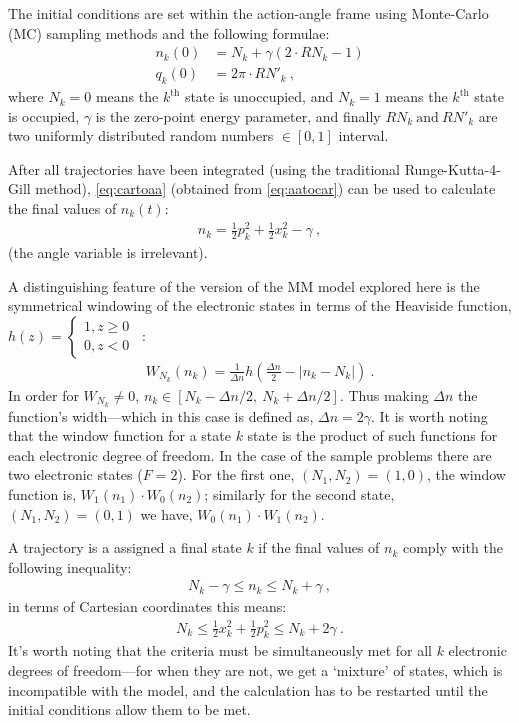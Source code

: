 The initial conditions are set within the action-angle frame using Monte-Carlo (MC) sampling methods and the following formulae:
\begin{subequations}
\begin{align}
n_{k}(0) &= N_{k} + \gamma (2 \cdot RN_{k} - 1)\\
q_{k}(0) &= 2\pi \cdot RN'_{k}~,
\end{align}
\end{subequations}
where $ N_{k} = 0$ means the $ k^{\text{th}} $ state is unoccupied, and $ N_{k} = 1 $ means the $ k^{\text{th}} $ state is occupied, $ \gamma $ is the zero-point energy parameter, and finally $ RN_{k}~\text{and}~RN'_{k} $ are two uniformly distributed random numbers $ \in [0,1] $ interval.

After all trajectories have been integrated (using the traditional Runge-Kutta-4-Gill method), \cref{eq:cartoaa} (obtained from \cref{eq:aatocar}) can be used to calculate the final values of $ n_{k}(t) $:
\begin{align}\label{eq:cartoaa}
n_{k} = \frac{1}{2} p_{k}^{2} + \frac{1}{2} x_{k}^{2} - \gamma~,
\end{align}
(the angle variable is irrelevant).

A distinguishing feature of the version of the MM model explored here is the symmetrical windowing of the electronic states in terms of the Heaviside function, $ h(z) = \left\{\begin{aligned}1, z \ge 0\\ 0, z < 0 \end{aligned}\right.$~:
\begin{align}\label{eq:window}
W_{N_{k}}(n_{k}) = \frac{1}{\Delta n} h\left(\frac{\Delta n}{2} - |n_{k}-N_{k}|\right)~.
\end{align}
In order for $ W_{N_{k}} \neq 0 $, $ n_{k} \in [N_{k} - \Delta n/2,~N_{k} + \Delta n/2]$. Thus making $ \Delta n $ the function's width---which in this case is defined as, $ \Delta n = 2\gamma $. It is worth noting that the window function for a state $ k $ state is the product of such functions for each electronic degree of freedom. In the case of the sample problems there are two electronic states ($ F = 2 $). For the first one, $( N_{1}, N_{2} ) = (1,0) $, the window function is, $ W_{1}(n_{1}) \cdot W_{0}(n_{2}) $; similarly for the second state, $ (N_{1}, N_{2}) = (0,1) $ we have, $ W_{0}(n_{1}) \cdot W_{1}(n_{2}) $.

A trajectory is a assigned a final state $ k $ if the final values of $ n_{k} $ comply with the following inequality:
\begin{align}
N_{k} - \gamma \le n_{k} \le N_{k} + \gamma~,
\end{align}
in terms of Cartesian coordinates this means:
\begin{align}\label{eq:select}
N_{k} \le \frac{1}{2} x_{k}^{2} + \frac{1}{2} p_{k}^{2} \le N_{k} + 2\gamma~.
\end{align}
It's worth noting that the criteria must be simultaneously met for all $ k $ electronic degrees of freedom---for when they are not, we get a `mixture' of states, which is incompatible with the model, and the calculation has to be restarted until the initial conditions allow them to be met.

